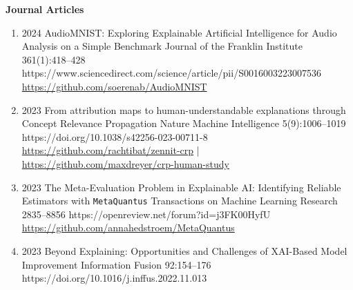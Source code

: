 \newpage
\vspace{5mm}
\headedsection %
{\bf Journal Articles}{ }
{
\begin{enumerate}

    \item {}
                        {2024}
                        {AudioMNIST: Exploring Explainable Artificial Intelligence for Audio Analysis on a Simple Benchmark}
                        {Journal of the Franklin Institute}
                        {361(1):418--428}
                        {https://www.sciencedirect.com/science/article/pii/S0016003223007536}
                        {\\\href{https://github.com/soerenab/AudioMNIST}{https://github.com/soerenab/AudioMNIST}}

    \item {}
                        {2023}
                        {From attribution maps to human-understandable explanations through Concept Relevance Propagation}
                        {Nature Machine Intelligence}
                        {5(9):1006--1019}
                        {https://doi.org/10.1038/s42256-023-00711-8}
                        {   \\
                            \href{https://github.com/rachtibat/zennit-crp}{https://github.com/rachtibat/zennit-crp} |
                            \href{https://github.com/maxdreyer/crp-human-study}{https://github.com/maxdreyer/crp-human-study}
                        }

    \item {}
                        {2023}
                        {The Meta-Evaluation Problem in Explainable AI: Identifying Reliable Estimators with \texttt{MetaQuantus}}
                        {Transactions on Machine Learning Research}
                        {2835--8856}
                        {https://openreview.net/forum?id=j3FK00HyfU}
                        {\\\href{https://github.com/annahedstroem/MetaQuantus}{https://github.com/annahedstroem/MetaQuantus}}

    \item {}
                        {2023}
                        {Beyond Explaining: Opportunities and Challenges of XAI-Based Model Improvement}
                        {Information Fusion}
                        {92:154--176}
                        {https://doi.org/10.1016/j.inffus.2022.11.013}


\end{enumerate}}
